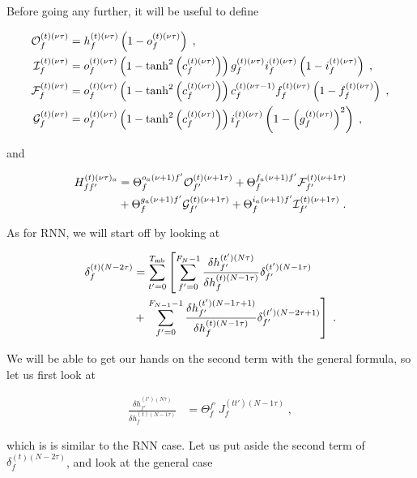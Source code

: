 \begin{subappendices}
Before  going any further, it will be useful to define 

\begin{align}
\mathcal{O}^{(t)(\nu\tau)}_{f}&=h^{(t)(\nu\tau)}_{f}
%
\left(1-o^{(t)(\nu\tau)}_{f}\right)\;,\notag\\
%
\mathcal{I}^{(t)(\nu\tau)}_{f}&=o^{(t)(\nu\tau)}_{f}\left(1-\tanh^2\left(c^{(t)(\nu\tau)}_{f}\right)
%
\right)g^{(t)(\nu\tau)}_{f} i^{(t)(\nu\tau)}_{f}\left(1-i^{(t)(\nu\tau)}_{f}\right)\;,\notag\\
%
\mathcal{F}^{(t)(\nu\tau)}_{f}&=o^{(t)(\nu\tau)}_{f}\left(1-\tanh^2\left(c^{(t)(\nu\tau)}_{f}\right)
%
\right)c^{(t)(\nu\tau-1)}_{f} f^{(t)(\nu\tau)}_{f}\left(1-f^{(t)(\nu\tau)}_{f}\right)\;,\notag\\
%
\mathcal{G}^{(t)(\nu\tau)}_{f}&=o^{(t)(\nu\tau)}_{f}\left(1-\tanh^2\left(c^{(t)(\nu\tau)}_{f}\right)
%
\right)i^{(t)(\nu\tau)}_{f}\left(1-\left(g^{(t)(\nu\tau)}_{f}\right)^2\right)\;,
\end{align}

and

\begin{align}
H^{(t)(\nu\tau)_a}_{ff'}&=\Theta^{o_a(\nu+1)f'}_{f}\mathcal{O}^{(t)(\nu+1\tau)}_{f'}
%
+\Theta^{f_a(\nu+1)f'}_{f}\mathcal{F}^{(t)(\nu+1\tau)}_{f'}\notag\\
%
&+\Theta^{g_a(\nu+1)f'}_{f}\mathcal{G}^{(t)(\nu+1\tau)}_{f'}
%
+\Theta^{i_a(\nu+1)f'}_{f}\mathcal{I}^{(t)(\nu+1\tau)}_{f'}\;.
\end{align}

As for RNN, we will start off by looking at 

\begin{align}
\delta^{(t)(N-2\tau)}_f&= \sum_{t'=0}^{T_{{\rm mb}}}\left[\sum_{f'=0}^{F_{N}-1}
%
\frac{\delta h^{(t')(N\tau)}_{f'}}{\delta h^{(t)(N-1\tau)}_f }\delta^{(t')(N-1\tau)}_{f'}\right.\notag\\
%
&+\left.\sum_{f'=0}^{F_{N-1}-1}\frac{\delta h^{(t')(N-1\tau+1)}_{f'}}{\delta h^{(t)(N-1\tau)}_f }\delta^{(t')(N-2\tau+1)}_{f'}\right]\;.
\end{align}

We will be able to get our hands on the second term with the general formula, so let us first look at

\begin{align}
\frac{\delta h^{(t')(N\tau)}_{f'}}{\delta h^{(t)(N-1\tau)}_f }&=\Theta^{f'}_{f}\,J_f^{(tt')(N-1\tau)}\;,
\end{align}

which is is similar to the RNN case. Let us put aside the second term of $\delta^{(t)(N-2\tau)}_f$, and look at the general case


\end{subappendices}
